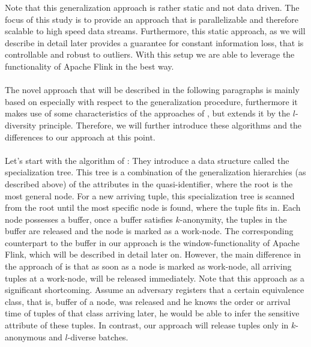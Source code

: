 \noindent Note that this generalization approach is rather static and not data driven. The focus of this study is to provide an approach that is parallelizable and therefore scalable to high speed data streams. Furthermore, this static approach, as we will describe in detail later provides a guarantee for constant information loss, that is controllable and robust to outliers. With this setup we are able to leverage the functionality of Apache Flink in the best way.\\
\\
The novel approach that will be described in the following paragraphs is mainly based on  especially with respect to the generalization procedure, furthermore it makes use of some characteristics of the approaches of , but extends it by the $l$-diversity principle. Therefore, we will further introduce these algorithms and the differences to our approach at this point.\\
\\
Let's start with the algorithm of : They introduce a data structure called the specialization tree. This tree is a combination of the generalization hierarchies (as described above) of the attributes in the quasi-identifier, where the root is the most general node. For a new arriving tuple, this specialization tree is scanned from the root until the most specific node is found, where the tuple fits in. Each node possesses a buffer, once a buffer satisfies $k$-anonymity, the tuples in the buffer are released and the node is marked as a work-node. The corresponding counterpart to the buffer in our approach is the window-functionality of Apache Flink, which will be described in detail later on. However, the main difference in the approach of  is that as soon as a node is marked as work-node, all arriving tuples at a work-node, will be released immediately. Note that this approach as a significant shortcoming. Assume an adversary registers that a certain equivalence class, that is, buffer of a node, was released and he knows the order or arrival time of tuples of that class arriving later, he would be able to infer the sensitive attribute of these tuples. In contrast, our approach will release tuples only in $k$-anonymous and $l$-diverse batches.\\
\\
